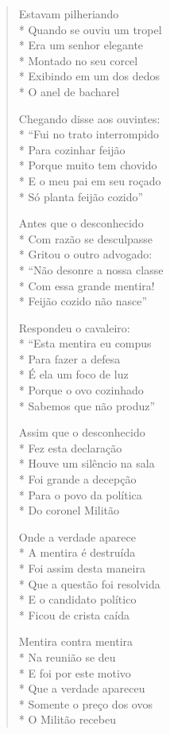 \begin{verse}
Estavam pilheriando\\*
Quando se ouviu um tropel\\*
Era um senhor elegante\\*
Montado no seu corcel\\*
Exibindo em um dos dedos\\*
O anel de bacharel

Chegando disse aos ouvintes:\\*
``Fui no trato interrompido\\*
Para cozinhar feijão\\*
Porque muito tem chovido\\*
E o meu pai em seu roçado\\*
Só planta feijão cozido''

Antes que o desconhecido\\*
Com razão se desculpasse\\*
Gritou o outro advogado:\\*
``Não desonre a nossa classe\\*
Com essa grande mentira!\\*
Feijão cozido não nasce''

Respondeu o cavaleiro:\\*
``Esta mentira eu compus\\*
Para fazer a defesa\\*
É ela um foco de luz\\*
Porque o ovo cozinhado\\*
Sabemos que não produz''

Assim que o desconhecido\\*
Fez esta declaração\\*
Houve um silêncio na sala\\*
Foi grande a decepção\\*
Para o povo da política\\*
Do coronel Militão

Onde a verdade aparece\\*
A mentira é destruída\\*
Foi assim desta maneira\\*
Que a questão foi resolvida\\*
E o candidato político\\*
Ficou de crista caída

Mentira contra mentira\\*
Na reunião se deu\\*
E foi por este motivo\\*
Que a verdade apareceu\\*
Somente o preço dos ovos\\*
O Militão recebeu


\end{verse}
